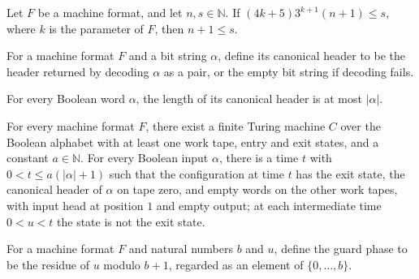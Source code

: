 \begin{lemma}
\label{Turing.MachineFormat.grammar_guard_states}
\leanok
{}
Let $F$ be a machine format, and let $n,s\in\mathbb N$. If $(4k+5)3^{k+1}(n+1)\le s$,
where $k$ is the parameter of $F$, then $n+1\le s$.
\end{lemma}

\begin{definition}
\label{Turing.MachineFormat.canonHeader}
\leanok
{}
For a machine format $F$ and a bit string $\alpha$, define its canonical header to be
the header returned by decoding $\alpha$ as a pair, or the empty bit string if decoding
fails.
\end{definition}

\begin{lemma}
\label{Turing.MachineFormat.canonHeader_length}
\leanok
{}
For every Boolean word $\alpha$, the length of its canonical header is at most
$|\alpha|$.
\end{lemma}

\begin{lemma}
\label{Turing.MachineFormat.exists_canonHeaderCall}
\leanok
{}
For every machine format $F$, there exist a finite Turing machine $C$ over the Boolean
alphabet with at least one work tape, entry and exit states, and a constant
$a\in\mathbb N$. For every Boolean input $\alpha$, there is a time $t$ with $0<t\le
a(|\alpha|+1)$ such that the configuration at time $t$ has the exit state, the
canonical header of $\alpha$ on tape zero, and empty words on the other work tapes,
with input head at position $1$ and empty output; at each intermediate time $0<u<t$ the
state is not the exit state.
\end{lemma}

\begin{definition}
\label{Turing.MachineFormat.guardPhase}
\leanok
For a machine format $F$ and natural numbers $b$ and $u$, define the guard phase to be
the residue of $u$ modulo $b+1$, regarded as an element of $\{0,\ldots,b\}$.
\end{definition}

